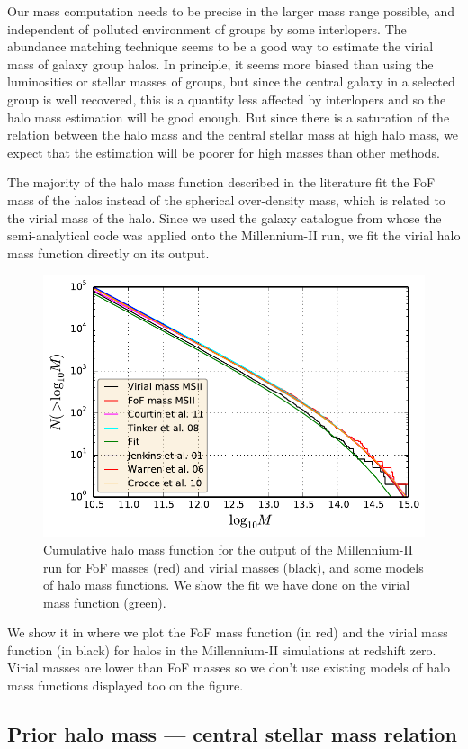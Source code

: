 Our mass computation needs to be precise in the larger mass range possible,
and independent of polluted environment of groups by some interlopers. The
abundance matching technique seems to be a good way to estimate the virial
mass of galaxy group halos. In principle, it seems more biased than using
the luminosities or stellar masses of groups, but since the central galaxy
in a selected group is well recovered, this is a quantity less affected by
interlopers and so the halo mass estimation will be good enough. But since
there is a saturation of the relation between the halo mass and the central
stellar mass at high halo mass, we expect that the estimation will be poorer
for high masses than other methods.

The majority of the halo mass function described in the literature fit the FoF
mass of the halos instead of the spherical over-density mass, which is related
to the virial mass of the halo. Since we used the galaxy catalogue from
\citet{Guo+11} whose the semi-analytical code was applied onto the
Millennium-II run, we fit the virial halo mass function directly on its output.
%
\begin{figure}[t]
    \centering
    \includegraphics[width=0.6\linewidth]{figures/maggie/hmf.pdf}
    \caption{Cumulative halo mass function for the output of the Millennium-II
    run for FoF masses (red) and virial masses (black), and some models of halo
mass functions. We show the fit we have done on the virial mass function
(green).\label{fig:hmf}}
\end{figure}
%
We show it in  where we plot the FoF mass function (in red)
and the virial mass function (in black) for halos in the Millennium-II
simulations at redshift zero. Virial masses are lower than FoF masses so we
don't use existing models of halo mass functions displayed too on the figure.

\subsection{Prior halo mass --- central stellar mass relation}

